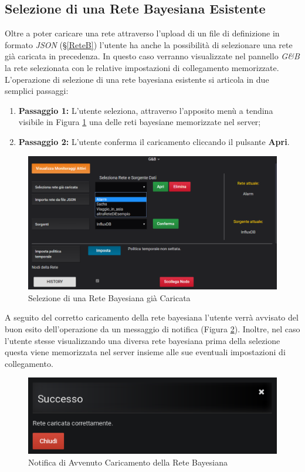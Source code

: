 \subsection{Selezione di una Rete Bayesiana Esistente}\label{SelezioneRete}

Oltre a poter caricare una rete attraverso l'upload di un file di definizione in formato \textit{JSON} (§\ref{ReteB}) l'utente ha anche la possibilità di selezionare una rete già caricata in precedenza. In questo caso verranno visualizzate nel pannello \textit{G\&B} la rete selezionata con le relative impostazioni di collegamento memorizzate.\\
L'operazione di selezione di una rete bayesiana esistente si articola in due semplici passaggi:
\begin{enumerate}
	\item \textbf{Passaggio 1:} L'utente seleziona, attraverso l'apposito menù a tendina visibile in Figura \ref{SelezioneReteImg} una delle reti bayesiane memorizzate nel server;
	\item \textbf{Passaggio 2:} L'utente conferma il caricamento cliccando il pulsante \textbf{Apri}.
\end{enumerate}

\begin{figure}[H]
	\begin{center}
		\includegraphics[scale=0.6]{./images/SelezioneRete.png}
		 \caption{Selezione di una Rete Bayesiana già Caricata}	
		 \label{SelezioneReteImg}
	\end{center}
\end{figure}

A seguito del corretto caricamento della rete bayesiana l'utente verrà avvisato del buon esito dell'operazione da un messaggio di notifica (Figura \ref{NotificaSelezioneRete}). Inoltre, nel caso l'utente stesse visualizzando una diversa rete bayesiana prima della selezione questa viene memorizzata nel server insieme alle sue eventuali impostazioni di collegamento.

\begin{figure}[H]
	\begin{center}
		\includegraphics[scale=0.6]{./images/NotificaSelezioneRete.png}
		 \caption{Notifica di Avvenuto Caricamento della Rete Bayesiana}	
		 \label{NotificaSelezioneRete}
	\end{center}
\end{figure}



